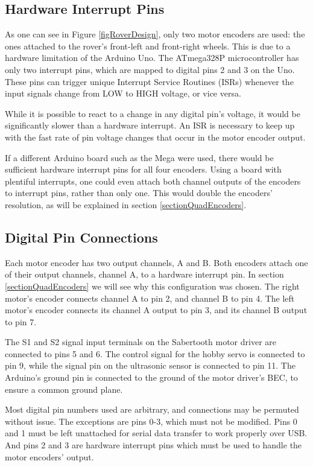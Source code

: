 \subsection{Hardware Interrupt Pins} \label{sectionHIP}
As one can see in Figure \ref{figRoverDesign}, only two motor encoders are used: the ones attached to the rover's front-left and front-right wheels. This is due to a hardware limitation of the Arduino Uno. The ATmega328P microcontroller has only two interrupt pins, which are mapped to digital pins 2 and 3 on the Uno. These pins can trigger unique Interrupt Service Routines (ISRs) whenever the input signals change from LOW to HIGH voltage, or vice versa.

While it is possible to react to a change in any digital pin's voltage, it would be significantly slower than a hardware interrupt. An ISR is necessary to keep up with the fast rate of pin voltage changes that occur in the motor encoder output.

If a different Arduino board such as the Mega were used, there would be sufficient hardware interrupt pins for all four encoders. Using a board with plentiful interrupts, one could even attach both channel outputs of the encoders to interrupt pins, rather than only one. This would double the encoders' resolution, as  will be explained in section \ref{sectionQuadEncoders}.

\subsection{Digital Pin Connections}
Each motor encoder has two output channels, A and B. Both encoders attach one of their output channels, channel A, to a hardware interrupt pin. In section \ref{sectionQuadEncoders} we will see why this configuration was chosen. The right motor's encoder connects channel A to pin 2, and channel B to pin 4. The left motor's encoder connects its channel A output to pin 3, and its channel B output to pin 7.

The S1 and S2 signal input terminals on the Sabertooth motor driver are connected to pins 5 and 6. The control signal for the hobby servo is connected to pin 9, while the signal pin on the ultrasonic sensor is connected to pin 11. The Arduino's ground pin is connected to the ground of the motor driver's BEC, to ensure a common ground plane.

Most digital pin numbers used are arbitrary, and connections may be permuted without issue. The exceptions are pins 0-3, which must not be modified. Pins 0 and 1 must be left unattached for serial data transfer to work properly over USB. And pins 2 and 3 are hardware interrupt pins which must be used to handle the motor encoders' output.

